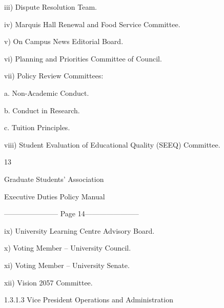   

         iii)      Dispute Resolution Team.   

  

         iv)       Marquis Hall Renewal and Food Service Committee.   

  

         v)        On Campus News Editorial Board.   

  

         vi)       Planning and Priorities Committee of Council.   

  

         vii)      Policy Review Committees:   

  

              a.       Non-Academic Conduct.   

  

              b.        Conduct in Research.   

              c.        Tuition Principles.   

  

         viii)     Student Evaluation of Educational Quality (SEEQ) Committee.   



                                                        13  

                                       

                                     Graduate Students’ Association  

                                    Executive Duties Policy Manual  

  


----------------------- Page 14-----------------------

  

  

  

  

          ix)       University Learning Centre Advisory Board.   

  

          x)        Voting Member – University Council.   

  

          xi)       Voting Member – University Senate.   

          xii)      Vision 2057 Committee.   

  

1.3.1.3             Vice President Operations and Administration   

